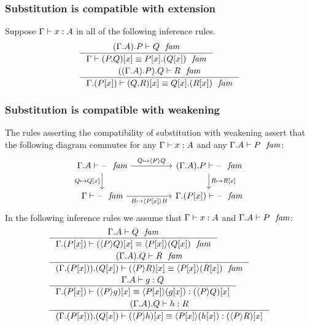 \subsubsection{Substitution is compatible with extension}\label{comp-se}
Suppose $\jterm{\Gamma}{A}{x}$ in all of the following inference rules.
\begin{align}
& \inference{\jfam{\ctxext{{\Gamma}{A}}{P}}{Q}}
  {\jfameq{\Gamma}{\subst{x}{\ctxext{P}{Q}}}{\ctxext{\subst{x}{P}}{\subst{x}{Q}}}}\\
& \inference{\jfam{\ctxext{{{\Gamma}{A}}{P}}{Q}}{R}}
  {\jfameq{\ctxext{\Gamma}{\subst{x}{P}}}{\subst{x}{\ctxext{Q}{R}}}{\ctxext{\subst{x}{Q}}{\subst{x}{R}}}}
\end{align}

\subsubsection{Substitution is compatible with weakening}\label{comp-sw}
The rules asserting the compatibility of substitution with weakening assert
that the following diagram commutes for any $\jterm{\Gamma}{A}{x}$ and any
$\jfam{\ctxext{\Gamma}{A}}{P}$:
\begin{equation*}
\begin{tikzcd}[column sep=huge]
\jfam{\ctxext{\Gamma}{A}}{\blank} \ar{d}[swap]{Q\mapsto\subst{x}{Q}} \ar{r}{Q\mapsto\ctxwk{P}{Q}} & \jfam{\ctxext{{\Gamma}{A}}{P}}{\blank} \ar{d}{R\mapsto\subst{x}{R}}\\ 
\jfam{\Gamma}{\blank} \ar{r}[swap]{B\mapsto\ctxwk{\subst{x}{P}}{B}} & \jfam{\ctxext{\Gamma}{\subst{x}{P}}}{\blank}
\end{tikzcd}
\end{equation*}
In the following inference rules we assume that $\jterm{\Gamma}{A}{x}$ and
$\jfam{\ctxext{\Gamma}{A}}{P}$:
\begin{align}
& \inference
    {\jfam{\ctxext{\Gamma}{A}}{Q}}
    {\jfameq{\ctxext{\Gamma}{\subst{x}{P}}}{\subst{x}{\ctxwk{P}{Q}}}{\ctxwk{\subst{x}{P}}{\subst{x}{Q}}}}\\
& \inference
    {\jfam{\ctxext{{\Gamma}{A}}{Q}}{R}}
    {\jfameq{\ctxext{{\Gamma}{\subst{x}{P}}}{\subst{x}{Q}}}{\subst{x}{\ctxwk{P}{R}}}{\ctxwk{\subst{x}{P}}{\subst{x}{R}}}}\\
& \inference
    {\jterm{\ctxext{\Gamma}{A}}{Q}{g}}
    {\jtermeq
      {\ctxext{\Gamma}{\subst{x}{P}}}
      {\subst{x}{\ctxwk{P}{Q}}}
      {\subst{x}{\ctxwk{P}{g}}}
      {\ctxwk{\subst{x}{P}}{\subst{x}{g}}}}\\
& \inference
    {\jterm{\ctxext{{\Gamma}{A}}{Q}}{R}{h}}
    {\jtermeq
      {\ctxext{{\Gamma}{\subst{x}{P}}}{\subst{x}{Q}}}
      {\subst{x}{\ctxwk{P}{R}}}
      {\subst{x}{\ctxwk{P}{h}}}
      {\ctxwk{\subst{x}{P}}{\subst{x}{h}}}}
\end{align}

